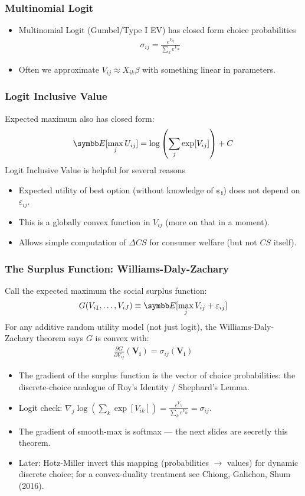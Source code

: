 \documentclass[aspectratio=169,11pt]{beamer}
\begin{document}
\begin{frame}
\frametitle{Multinomial Logit}
\begin{itemize}
\item Multinomial Logit (Gumbel/Type I EV) has closed form choice probabilities
\begin{eqnarray*}
\sigma_{ij} = \frac{e^{V_{ij}}}{\sum_k e^{V_{ik}}}
\end{eqnarray*}
\item Often we approximate $V_{ij} \approx  X_{ik} \beta$ with something linear in parameters.
\end{itemize}
\end{frame}


\begin{frame}
\frametitle{Logit Inclusive Value}
 Expected maximum also has closed form:
\begin{eqnarray*}
\E[\max_j U_{ij}] = \log \left(\sum_j \exp[V_{ij}] \right) + C
\end{eqnarray*}
Logit Inclusive Value is helpful for several reasons
\begin{itemize}
\item Expected utility of best option (without knowledge of $\symbf{\varepsilon_i}$) does not depend on $\varepsilon_{ij}$.
\item This is a globally \alert{convex} function in $V_{ij}$ (more on that in a moment).
\item Allows simple computation of $\Delta CS$ for consumer welfare (but not $CS$ itself).
\end{itemize}
\end{frame}

\begin{frame}
\frametitle{The Surplus Function: Williams-Daly-Zachary}
Call the expected maximum the \alert{social surplus function}:
\begin{eqnarray*}
G(V_{i1},\ldots,V_{iJ}) \equiv \E[\max_j V_{ij} + \varepsilon_{ij}]
\end{eqnarray*}
For \alert{any} additive random utility model (not just logit), the \alert{Williams-Daly-Zachary theorem} says $G$ is convex with:
\begin{eqnarray*}
\frac{\partial G}{\partial V_{ij}}(\symbf{V_i}) = \sigma_{ij}(\symbf{V_i})
\end{eqnarray*}
\begin{itemize}
\item The gradient of the surplus function is the vector of choice probabilities: the discrete-choice analogue of Roy's Identity / Shephard's Lemma.
\item Logit check: $\nabla_j \log \left( \sum_k \exp[V_{ik}]\right) = \frac{e^{V_{ij}}}{\sum_k e^{V_{ik}}} = \sigma_{ij}$.
\item The gradient of smooth-max is softmax --- the next slides are secretly this theorem.
\item Later: Hotz-Miller \alert{invert} this mapping (probabilities $\rightarrow$ values) for dynamic discrete choice; for a convex-duality treatment see Chiong, Galichon, Shum (2016).
\end{itemize}
\end{frame}
\end{document}
